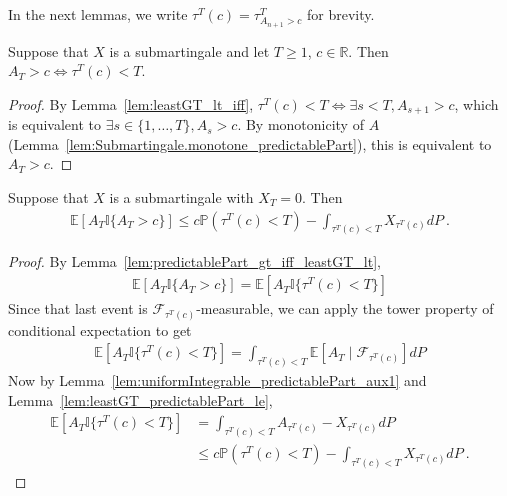 In the next lemmas, we write $\tau^T(c) = \tau^T_{A_{n+1}>c}$ for brevity.

\begin{lemma}\label{lem:predictablePart_gt_iff_leastGT_lt}
Suppose that $X$ is a submartingale and let $T \ge 1$, $c \in \mathbb{R}$.
Then $A_T > c \iff \tau^T(c) < T$.
\end{lemma}

\begin{proof}
By Lemma~\ref{lem:leastGT_lt_iff}, $\tau^T(c) < T \iff \exists s < T, A_{s+1} > c$, which is equivalent to $\exists s \in \{1, \ldots, T\}, A_s > c$.
By monotonicity of $A$ (Lemma~\ref{lem:Submartingale.monotone_predictablePart}), this is equivalent to $A_T > c$.
\end{proof}


\begin{lemma}\label{lem:uniformIntegrable_predictablePart_aux2}
Suppose that $X$ is a submartingale with $X_T = 0$.
Then
\begin{align*}
  \mathbb{E}\left[A_T \mathbb{I}\{A_T > c\} \right]
  \le c \mathbb{P}(\tau^T(c) < T) - \int_{\tau^T(c) < T} X_{\tau^T(c)} dP
  \: .
\end{align*}
\end{lemma}

\begin{proof}
By Lemma~\ref{lem:predictablePart_gt_iff_leastGT_lt},
\begin{align*}
  \mathbb{E}\left[A_T \mathbb{I}\{A_T > c\} \right]
  = \mathbb{E}\left[A_T \mathbb{I}\{\tau^T(c) < T\} \right]
\end{align*}
Since that last event is $\mathcal{F}_{\tau^T(c)}$-measurable, we can apply the tower property of conditional expectation to get
\begin{align*}
  \mathbb{E}\left[A_T \mathbb{I}\{\tau^T(c) < T\} \right]
  = \int_{\tau^T(c) < T} \mathbb{E}[A_T \mid \mathcal{F}_{\tau^T(c)}] dP
\end{align*}
Now by Lemma~\ref{lem:uniformIntegrable_predictablePart_aux1} and Lemma~\ref{lem:leastGT_predictablePart_le},
\begin{align*}
  \mathbb{E}\left[A_T \mathbb{I}\{\tau^T(c) < T\} \right]
  &= \int_{\tau^T(c) < T} A_{\tau^T(c)} - X_{\tau^T(c)} dP
  \\
  &\le c \mathbb{P}(\tau^T(c) < T) - \int_{\tau^T(c) < T} X_{\tau^T(c)} dP
  \: .
\end{align*}
\end{proof}


